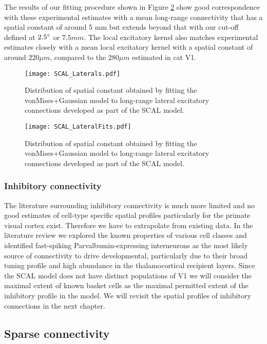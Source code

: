 The results of our fitting procedure shown in Figure \ref{LatDist}
show good correspondence with these experimental estimates with a mean
long-range connectivity that has a spatial constant of around 5 mm but
extends beyond that with our cut-off defined at $2.5\degree$ or $7.5
mm$. The local excitatory kernel also matches experimental estimates
closely with a mean local excitatory kernel with a spatial constant of
around $220 \mu m$, compared to the $280 \mu m$ estimated in cat V1.

\begin{figure}
	\centering
        \texttt{[image: SCAL\_Laterals.pdf]}
	\caption{Distribution of spatial constant obtained by fitting
          the \cite{Buzas2006} vonMises+Gaussian model to long-range
          lateral excitatory connections developed as part of the SCAL
          model.}
	\label{LatFits}
\end{figure}

\begin{figure}
	\centering
        \texttt{[image: SCAL\_LateralFits.pdf]}
	\caption{Distribution of spatial constant obtained by fitting
          the \cite{Buzas2006} vonMises+Gaussian model to long-range
          lateral excitatory connections developed as part of the SCAL
          model.}
	\label{LatDist}
\end{figure}

\subsubsection{Inhibitory connectivity}

The literature surrounding inhibitory connectivity is much more
limited and no good estimates of cell-type specific spatial profiles
particularly for the primate visual cortex exist. Therefore we have to
extrapolate from existing data. In the literature review we explored
the known properties of various cell classes and identified
fast-spiking Parvalbumin-expressing interneurons as the most likely
source of connectivity to drive developmental, particularly due to
their broad tuning profile and high abundance in the thalamocortical
recipient layers. Since the SCAL model does not have distinct
populations of V1 we will consider the maximal extent of known basket
cells as the maximal permitted extent of the inhibitory profile in the
model. We will revisit the spatial profiles of inhibitory connections
in the next chapter.

\subsection{Sparse connectivity}

